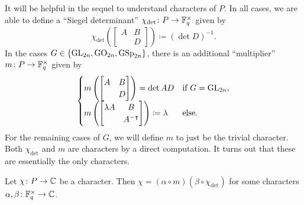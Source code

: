 It will be helpful in the sequel to understand characters of $P$. In all cases, we are able to define a ``Siegel determinant'' $\chi_{\det}\colon P\to\mathbb F_q^\times$ given by
\[\chi_{\det}\left(\begin{bmatrix}
    A & B \\
      & D
\end{bmatrix}\right)\coloneqq(\det D)^{-1}.\]
In the cases $G\in\{\mathrm{GL}_{2n},\mathrm{GO}_{2n},\mathrm{GSp}_{2n}\}$, there is an additional ``multiplier'' $m\colon P\to\mathbb F_q^\times$ given by
\[\begin{cases}
    m\left(\begin{bmatrix}
        A & B \\
          & D
    \end{bmatrix}\right)=\det AD & \text{if }G=\mathrm{GL}_{2n}, \\
    m\left(\begin{bmatrix}
        \lambda A & B \\
          & A^{-\intercal}
    \end{bmatrix}\right)\coloneqq\lambda & \text{else}.
\end{cases}\]
For the remaining cases of $G$, we will define $m$ to just be the trivial character. Both $\chi_{\det}$ and $m$ are characters by a direct computation. It turns out that these are essentially the only characters.
\begin{lemma} \label{lem:decompose-character}
    Let $\chi\colon P\to\mathbb C$ be a character. Then $\chi=(\alpha\circ m)(\beta\circ\chi_{\det})$ for some characters $\alpha,\beta\colon\mathbb F_q^\times\to\mathbb C$.
\end{lemma}
